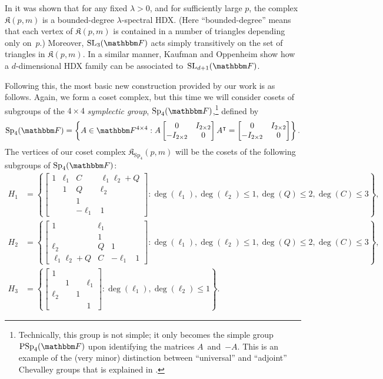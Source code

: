 \documentclass[10pt,a4paper]{article}
\theoremstyle{definition}
\newcommand{\F}{\mathbbm F}
\newcommand{\SL}{{\mathrm{SL}}}
\newcommand{\SP}{{\mathrm{Sp}}}
\newcommand{\PSp}{{\mathrm{PSp}}}
\newcommand{\complex}{\mathfrak{K}}
\begin{document}
In \cite{KO18} it was shown that for any fixed $\lambda > 0$, and for sufficiently large $p$, the complex $\complex(p,m)$ is a bounded-degree $\lambda$-spectral HDX.
(Here ``bounded-degree'' means that each vertex of $\complex(p,m)$ is contained in a number of triangles depending only on~$p$.)
Moreover, $\SL_3(\F)$ acts simply transitively on the set of triangles in $\complex(p,m)$.
In a similar manner, Kaufman and Oppenheim show how a $d$-dimensional HDX family can be associated to~$\SL_{d+1}(\F)$.

Following this, the most basic new construction provided by our work is as follows.
Again, we form a coset complex, but this time we will consider cosets of subgroups of the $4 \times 4$ \emph{symplectic group}, $\SP_4(\F)$,\footnote{%
Technically, this group is not simple; it only becomes the simple group $\PSp_4(\F)$ upon identifying the matrices $A$~and~$-A$.
This is an example of the (very minor) distinction between ``universal'' and ``adjoint'' Chevalley groups that is explained in .\label{foot:universal}} defined by
\[\SP_4(\F) = \left \{ A \in \F^{4 \times 4} : A\begin{bmatrix}
0 & I_{2\times 2}\\
-I_{2\times 2} & 0
\end{bmatrix}A^\intercal = \begin{bmatrix}
0 & I_{2\times 2}\\
-I_{2\times 2} & 0
\end{bmatrix} \right \} .\]
The vertices of our coset complex $\complex_{\SP_4}(p,m)$ will be the cosets of the following subgroups of $\SP_4(\F)$:
\begin{align*}
H_1 &=
\left \{ \begin{bmatrix}
1 & \ell_1 & C & \ell_1 \ell_2 + Q\\
 & 1 & Q & \ell_2\\
 &  & 1& \\
 &  & -\ell_1 & 1
\end{bmatrix} : \deg(\ell_1),\deg(\ell_2) \le 1, \deg(Q) \le 2, \deg(C) \le 3 \right \},\\
H_2 &=
\left \{ \begin{bmatrix}
1 & \ell_1 &  & \\
 & 1 &  & \\
\ell_2 & Q & 1& \\
\ell_1 \ell_2 + Q & C & -\ell_1 & 1
\end{bmatrix}  : \deg(\ell_1),\deg(\ell_2) \le 1, \deg(Q) \le 2, \deg(C) \le 3 \right \},\\
H_3 &= \left \{
\begin{bmatrix}
1 &  &  & \\
 & 1 &  & \ell_1\\
\ell_2 &  & 1& \\
 &   &  & 1
\end{bmatrix} : \deg(\ell_1), \deg(\ell_2) \le 1 \right \}.
\end{align*}
\end{document}
